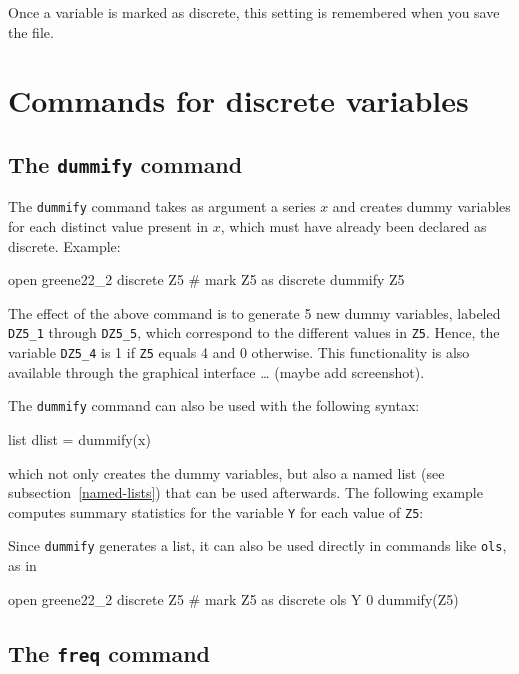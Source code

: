 Once a variable is marked as discrete, this setting is remembered when
you save the file.

\section{Commands for discrete variables}
\label{discr-commands}

\subsection{The \texttt{dummify} command}
\label{discr-dummify}

The \texttt{dummify} command takes as argument a series $x$ and creates
dummy variables for each distinct value present in $x$, which must
have already been declared as discrete.  Example:
\begin{code}
  open greene22_2
  discrete Z5 # mark Z5 as discrete
  dummify Z5
\end{code}

The effect of the above command is to generate 5 new dummy variables,
labeled \texttt{DZ5\_1} through \texttt{DZ5\_5}, which correspond to
the different values in \texttt{Z5}. Hence, the variable
\texttt{DZ5\_4} is 1 if \texttt{Z5} equals 4 and 0 otherwise. This
functionality is also available through the graphical interface \ldots
(maybe add screenshot).


The \texttt{dummify} command can also be used with the following
syntax:
\begin{code}
  list dlist = dummify(x)
\end{code}
which not only creates the dummy variables, but also a named list (see
subsection~\ref{named-lists}) that can be used afterwards. The
following example computes summary statistics for the variable \texttt{Y} for
each value of \texttt{Z5}:

Since \texttt{dummify} generates a list, it can also be used directly
in commands like \texttt{ols}, as in 
\begin{code}
  open greene22_2
  discrete Z5 # mark Z5 as discrete
  ols Y 0 dummify(Z5)
\end{code}

\subsection{The \texttt{freq} command}
\label{discr-freq}

